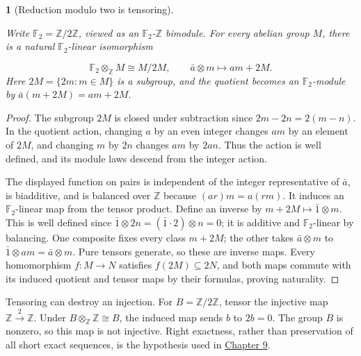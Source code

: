 \documentclass[11pt,a4paper]{article}
\newcommand{\mathheading}{}
\theoremstyle{plain}
\newtheorem*{plainstatement}{\mathheading}
\theoremstyle{definition}
\newenvironment{mathstatement}[3]{\renewcommand{\mathheading}{#1 #2}\begin{plainstatement}[#3]}{\end{plainstatement}}
\begin{document}
\begin{mathstatement}{Proposition}{6.8}{Reduction modulo two is tensoring}
\label{env-6-8}

Write \(\mathbb F_2=\mathbb Z/2\mathbb Z\), viewed as an \(\mathbb F_2\)-\(\mathbb Z\) bimodule. For every abelian group \(M\), there is a natural \(\mathbb F_2\)-linear isomorphism

 \[\mathbb F_2\otimes_{\mathbb Z}M\cong M/2M,\qquad \bar a\otimes m\longmapsto am+2M.\] 
Here \(2M=\{2m:m\in M\}\) is a subgroup, and the quotient becomes an \(\mathbb F_2\)-module by \(\bar a(m+2M)=am+2M\).


\par{}\par

\end{mathstatement}
 
\begin{proof}

The subgroup \(2M\) is closed under subtraction since \(2m-2n=2(m-n)\). In the quotient action, changing \(a\) by an even integer changes \(am\) by an element of \(2M\), and changing \(m\) by \(2n\) changes \(am\) by \(2an\). Thus the action is well defined, and its module laws descend from the integer action.


The displayed function on pairs is independent of the integer representative of \(\bar a\), is biadditive, and is balanced over \(\mathbb Z\) because \((ar)m=a(rm)\). It induces an \(\mathbb F_2\)-linear map from the tensor product. Define an inverse by \(m+2M\mapsto\bar1\otimes m\). This is well defined since \(\bar1\otimes2n=(\bar1\cdot2)\otimes n=0\); it is additive and \(\mathbb F_2\)-linear by balancing. One composite fixes every class \(m+2M\); the other takes \(\bar a\otimes m\) to \(\bar1\otimes am=\bar a\otimes m\). Pure tensors generate, so these are inverse maps. Every homomorphism \(f:M\to N\) satisfies \(f(2M)\subseteq2N\), and both maps commute with its induced quotient and tensor maps by their formulas, proving naturality.


\end{proof}
 
Tensoring can destroy an injection. For \(B=\mathbb Z/2\mathbb Z\), tensor the injective map \(\mathbb Z\xrightarrow{2}\mathbb Z\). Under \(B\otimes_{\mathbb Z}\mathbb Z\cong B\), the induced map sends \(b\) to \(2b=0\). The group \(B\) is nonzero, so this map is not injective. Right exactness, rather than preservation of all short exact sequences, is the hypothesis used in \hyperref[chapter-09]{Chapter 9}.
\end{document}
